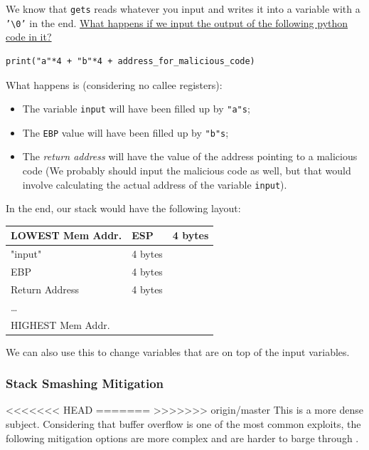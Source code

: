 \documentclass[11pt]{article}
\begin{document}
We know that \texttt{gets} reads whatever you input and writes it into a variable with a \texttt{'\textbackslash{}0'} in the end. \uline{What happens if we input the output of the following python code in it?}

\begin{verbatim}
print("a"*4 + "b"*4 + address_for_malicious_code)
\end{verbatim}

What happens is (considering no callee registers):
\begin{itemize}
\item The variable \texttt{input} will have been filled up by \texttt{"a"s};
\item The \texttt{EBP} value will have been filled up by \texttt{"b"s};
\item The \emph{return address} will have the value of the address pointing to a malicious code (We probably should input the malicious code as well, but that would involve calculating the actual address of the variable \texttt{input}).
\end{itemize}

In the end, our stack would have the following layout:

\begin{center}
\begin{tabular}{l|l|l}
\hline
LOWEST Mem Addr. & ESP & 4 bytes\\
\hline
"input" & 4 bytes & \\
\hline
EBP & 4 bytes & \\
\hline
Return Address & 4 bytes & \\
\hline
\ldots{} &  & \\
\hline
HIGHEST Mem Addr. &  & \\
\hline
\end{tabular}
\end{center}

We can also use this to change variables that are on top of the input variables.

\subsubsection{Stack Smashing Mitigation}
<<<<<<< HEAD
\label{sec:org899e217}
=======
\label{sec:org5f444ca}
>>>>>>> origin/master
This is a more dense subject. Considering that buffer overflow is one of the most common exploits, the following mitigation options are more complex and are harder to barge through \cite{MemoryDefenseSlide}.
\end{document}
